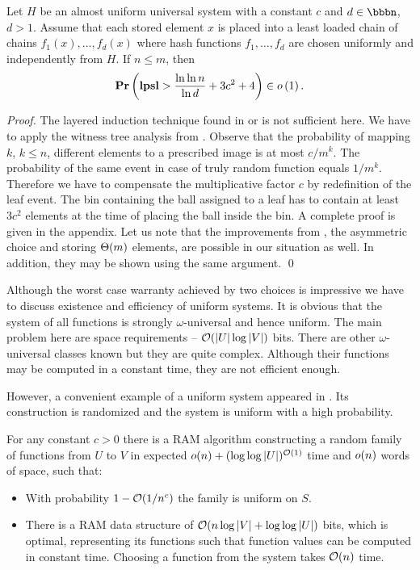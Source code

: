 \begin{theorem}
\label{theorem-universal-hashing-two-choices}
Let $H$ be an almost uniform universal system with a constant $c$ and $d \in \bbbn$, $d > 1$. Assume that each stored element $x$ is placed into a least loaded chain of chains $f_1(x), \dots, f_d(x)$ where hash functions $f_1, \dots, f_d$ are chosen uniformly and independently from $H$. If $n \leq m$, then $$\mathbf{Pr}\left(\mathbf{lpsl} > \frac{\ln \ln n}{\ln d} + 3c^2 + 4\right) \in o\left(1\right).$$
\end{theorem}
\begin{proof}
The layered induction technique found in \cite{Mitzenmacher:2005:PCR:1076315} or \cite{DBLP:conf/stoc/AzarBKU94} is not sufficient here. 
We have to apply the witness tree analysis from \cite{DBLP:journals/jacm/Vocking03}. 
Observe that the probability of mapping $k$, $k \leq n$, different elements to a prescribed image is at most ${c}/{m^k}$. 
The probability of the same event in case of truly random function equals ${1}/{m^k}$. 
Therefore we have to compensate the multiplicative factor $c$ by redefinition of the leaf event. 
The bin containing the ball assigned to a leaf has to contain at least $3c^2$ elements at the time of placing the ball inside the bin.
A complete proof is given in the appendix.
Let us note that the improvements from \cite{DBLP:journals/jacm/Vocking03}, the asymmetric choice and storing $\mathrm{\Theta}(m)$ elements, are possible in our situation as well. 
In addition, they may be shown using the same argument.
\qed
\end{proof}

Although the worst case warranty achieved by two choices is impressive we have to discuss existence and efficiency of uniform systems. It is obvious that the system of all functions is strongly $\omega$-universal and hence uniform. The main problem here are space requirements -- $\mathcal{O}(|U| \log |V|)$ bits. There are other $\omega$-universal classes known but they are quite complex. Although their functions may be computed in a constant time, they are not efficient enough. 

However, a convenient example of a uniform system appeared in \cite{DBLP:journals/siamcomp/PaghP08}. Its construction is randomized and the system is uniform with a high probability.
\begin{theorem}
\label{theorem-uniform-system}
For any constant $c > 0$ there is a RAM algorithm constructing a random family of functions from $U$ to $V$ in expected $o(n) + (\log \log|U|)^{\mathcal{O}(1)}$ time and $o(n)$ words of space, such that:
\begin{itemize}
\item With probability $1 - \mathcal{O}(1 / n^c)$ the family is uniform on $S$.
\item There is a RAM data structure of $\mathcal{O}(n \log|V| + \log \log|U|)$ bits, which is optimal, representing its functions such that function values can be computed in constant time. Choosing a function from the system takes $\mathcal{O}(n)$ time.
\end{itemize}
\end{theorem}

